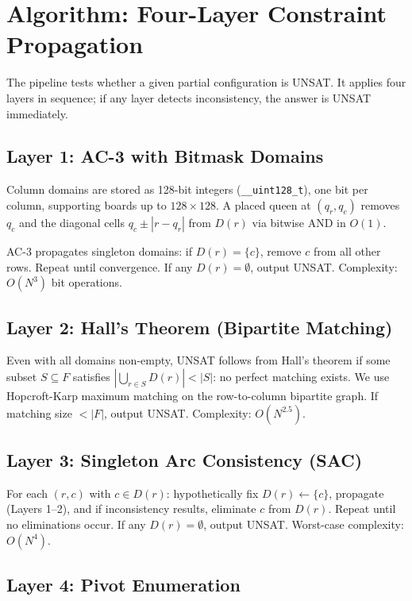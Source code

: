 \documentclass[11pt]{article}
\begin{document}
\section{Algorithm: Four-Layer Constraint Propagation}
\label{sec:algorithm}

The pipeline tests whether a given partial configuration is UNSAT.
It applies four layers in sequence; if any layer detects inconsistency,
the answer is UNSAT immediately.

\subsection{Layer 1: AC-3 with Bitmask Domains}

Column domains are stored as 128-bit integers (\texttt{\_\_uint128\_t}),
one bit per column, supporting boards up to $128 \times 128$.
A placed queen at $(q_r, q_c)$ removes $q_c$ and the diagonal cells
$q_c \pm |r - q_r|$ from $D(r)$ via bitwise AND in $O(1)$.

AC-3 propagates singleton domains: if $D(r) = \{c\}$, remove $c$ from all
other rows. Repeat until convergence. If any $D(r) = \emptyset$, output UNSAT.
Complexity: $O(N^3)$ bit operations.

\subsection{Layer 2: Hall's Theorem (Bipartite Matching)}

Even with all domains non-empty, UNSAT follows from Hall's theorem if some
subset $S \subseteq F$ satisfies $|\bigcup_{r \in S} D(r)| < |S|$: no perfect
matching exists.
We use Hopcroft-Karp maximum matching on the row-to-column bipartite graph.
If matching size $< |F|$, output UNSAT. Complexity: $O(N^{2.5})$.

\subsection{Layer 3: Singleton Arc Consistency (SAC)}

For each $(r, c)$ with $c \in D(r)$: hypothetically fix $D(r) \leftarrow \{c\}$,
propagate (Layers 1--2), and if inconsistency results, eliminate $c$ from $D(r)$.
Repeat until no eliminations occur. If any $D(r) = \emptyset$, output UNSAT.
Worst-case complexity: $O(N^4)$.

\subsection{Layer 4: Pivot Enumeration}
\end{document}

